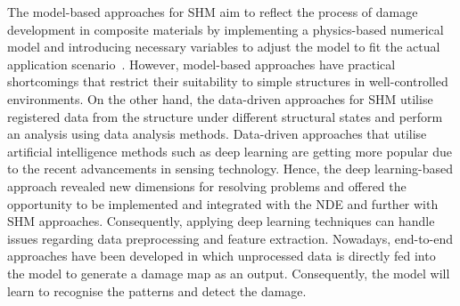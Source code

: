 The model-based approaches for SHM aim to reflect the process of damage development in composite materials by implementing a physics-based numerical model and introduc\-ing necessary variables to adjust the model to fit the actual application scenario~\cite{Wu2021}. 
However, model-based approaches have practical shortcomings that restrict their suitabi\-lity to simple structures in well-controlled environments.
On the other hand, the data-driven approaches for SHM utilise registered data from the structure under different structural states and perform an analysis using data analysis methods.
Data-driven approaches that utilise artificial intelligence methods such as deep learning are getting more popular due to the recent advancements in sensing technology.
Hence, the deep learning-based approach revealed new dimensions for resolving problems and offered the opportunity to be implemented and integrated with the NDE and further with SHM approaches.
Consequently, applying deep learning techniques can handle issues regarding data preprocessing and feature extraction.
Nowadays, end-to-end approaches have been developed in which unprocessed data is directly fed into the model to generate a damage map as an output.
Consequently, the model will learn to recognise the patterns and detect the damage.
%

%
